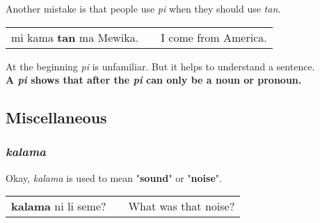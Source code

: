 %
%
%
%
%
Another mistake is that people use \textit{pi} when they should use \textit{tan}. 

\begin{supertabular}{p{5,5cm}|ll}
mi kama \textbf{tan} ma Mewika. && I come from America. \\
\end{supertabular}  

At the beginning \textit{pi} is unfamiliar. 
But it helps to understand a sentence. \\
\textbf{A \textit{pi} shows that after the \textit{pi} can only be a noun or pronoun.}

%
\newpage
\subsection*{Miscellaneous}
%
\subsubsection*{\textit{kalama}}
%
Okay, \textit{kalama} is used to mean "\textbf{sound}" or "\textbf{noise}".  \\
\begin{supertabular}{p{5,5cm}|ll}
\textbf{kalama} ni li seme? && What was that noise? \\
\end{supertabular}  

